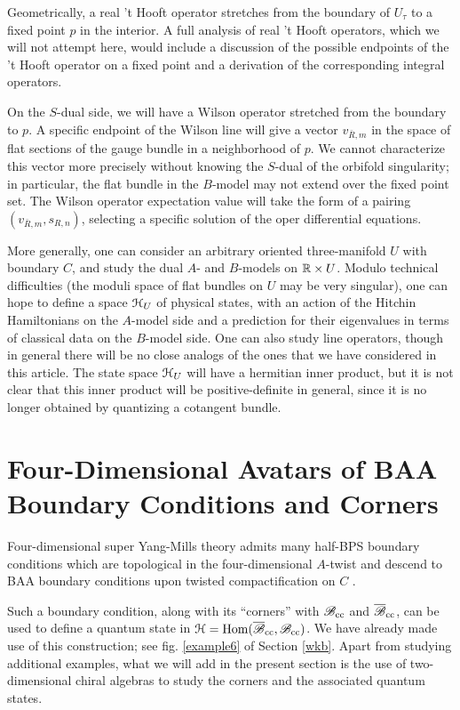 \documentclass[11pt,a4paper]{article}
\begin{document}
Geometrically, a real 't Hooft operator stretches from the boundary  of $U_\tau$ to a fixed point $p$ in the interior.
A full analysis of real 't Hooft operators, which we will not attempt here, would include a discussion of the possible endpoints of the 't Hooft operator 
on a fixed point and a derivation of the corresponding integral operators. 
 
On the $S$-dual side, we will have a Wilson operator stretched from the boundary to $p$.  A specific endpoint of the Wilson line will give a vector $v_{\bar R,m}$ in the space of flat sections of the gauge bundle in a neighborhood of $p$. We cannot characterize this vector more precisely without knowing the $S$-dual of the orbifold
singularity;  in particular, the flat bundle in the $B$-model may not extend over the fixed point set.
The Wilson operator expectation value will take the form of a pairing $(v_{\bar R,m}, s_{R,n})$,
selecting a specific solution of the oper differential equations. 

More generally, one can consider an arbitrary oriented three-manifold $U$ with boundary
$C$, and study the dual $A$- and $B$-models on ${\mathbb{R}}\times U$.   Modulo technical difficulties (the moduli space of flat bundles on $U$ may be very
singular), one can hope to define a space ${\mathcal H}_U$ of physical states, with an action of the Hitchin Hamiltonians on the $A$-model side and a prediction
for their eigenvalues in terms of classical data on the $B$-model side. One can also study line operators, though in general there will be no close
analogs of the ones that we have considered in this article.   The state space  ${\mathcal H}_U$  will have a hermitian inner product, but it is not
clear that this inner product will be positive-definite in general, since it is no longer obtained by quantizing a cotangent bundle.

\section{Four-Dimensional Avatars of BAA Boundary Conditions and Corners}\label{avatar}




Four-dimensional super Yang-Mills theory admits many half-BPS boundary conditions \cite{Gaiotto:2008sa} 
which are topological in the four-dimensional $A$-twist and descend to BAA boundary conditions upon twisted compactification 
on $C$ \cite{KW,Gaiotto:2016hvd,Gaiotto:2016wcv}. 

Such a boundary condition, along with its ``corners'' with ${\mathscr B}_{\mathrm{cc}}$ and $\overline{{\mathscr B}}_{\mathrm{cc}}$, can be used to define a quantum state in
${\mathcal H}={\mathrm{Hom}}(\overline{{\mathscr B}}_{\mathrm{cc}},{\mathscr B}_{\mathrm{cc}})$.   We have already made use of this construction; see fig. \ref{example6} of Section \ref{wkb}.
Apart from studying additional examples, what we will add in the present section is the use of two-dimensional chiral algebras to study the
corners and the associated quantum states. 
\end{document}
